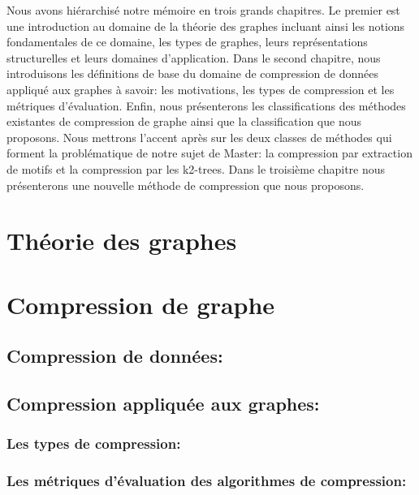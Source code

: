 \documentclass[a4paper,oneside,12pt]{report}
\theoremstyle{definition}
\begin{document}
			
			 Nous avons hiérarchisé notre mémoire en trois grands chapitres. Le premier est une introduction au domaine de la théorie des graphes incluant ainsi les notions fondamentales de ce domaine, les types de graphes, leurs représentations structurelles et leurs domaines d'application. Dans le second chapitre, nous introduisons les définitions de base du domaine de compression de données appliqué aux graphes à savoir: les motivations, les types de compression et les métriques d'évaluation. Enfin, nous présenterons les classifications des méthodes existantes de compression de graphe ainsi que la classification que nous proposons. Nous mettrons l'accent après sur les deux classes de méthodes qui forment la problématique de notre sujet de Master: la compression par extraction de motifs et la compression par les k2-trees. Dans le troisième chapitre nous présenterons une nouvelle méthode de compression que nous proposons.
	



	\chapter{ Théorie des graphes}
	  
	

	\chapter{Compression de graphe}
		
		\section{Compression de données: }
			
		
		\section{Compression appliquée aux graphes:}
			
			
	
			\subsection{Les types de compression:}
			
			
	
			\subsection{Les métriques d'évaluation des algorithmes de compression:}
				
			
\end{document}
